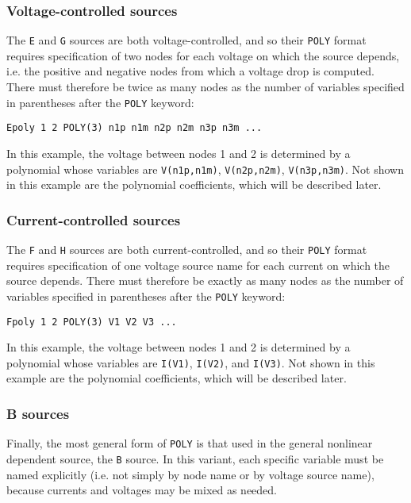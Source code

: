 \subsubsection{Voltage-controlled sources}

The \texttt{E} and \texttt{G} sources are both voltage-controlled, and
so their \texttt{POLY} format requires specification of two nodes for
each voltage on which the source depends, i.e. the positive and
negative nodes from which a voltage drop is computed.  There must
therefore be twice as many nodes as the number of variables specified
in parentheses after the \texttt{POLY} keyword:

\verb|Epoly 1 2 POLY(3) n1p n1m n2p n2m n3p n3m ...|

In this example, the voltage between nodes 1 and 2 is determined by
a polynomial whose variables are \texttt{V(n1p,n1m)},
\texttt{V(n2p,n2m)}, \texttt{V(n3p,n3m)}.  Not shown in this example
are the polynomial coefficients, which will be described later.


\subsubsection{Current-controlled sources}

The \texttt{F} and \texttt{H} sources are both current-controlled, and
so their \texttt{POLY} format requires specification of one voltage
source name for each current on which the source depends.
There must therefore be exactly as many nodes as the number of variables
specified in parentheses after the \texttt{POLY} keyword:

\verb|Fpoly 1 2 POLY(3) V1 V2 V3 ...|

In this example, the voltage between nodes 1 and 2 is determined by
a polynomial whose variables are \texttt{I(V1)},
\texttt{I(V2)}, and \texttt{I(V3)}.  Not shown in this example
are the polynomial coefficients, which will be described later.

\subsubsection{B sources}

Finally, the most general form of \texttt{POLY} is that used in the
general nonlinear dependent source, the \texttt{B} source. In this variant,
each specific variable must be named explicitly (i.e. not simply by node name or
by voltage source name), because currents and voltages may be mixed as
needed.

